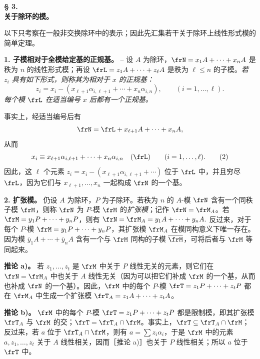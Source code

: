 \begin{center}
\textbf{§ 3.}\\[0.4em]
\textbf{关于除环的模。}
\end{center}

以下只考察在一般非交换除环中的表示；因此先汇集若干关于除环上线性形式模的简单定理。

\noindent\textbf{1. 子模相对于全模给定基的正规基。} -- 设 \(A\) 为除环，\(\frN=x_1A+\cdots+x_nA\) 是秩为 \(n\) 的线性形式模；再设 \(\frL=z_1A+\cdots+z_\ell A\) 是秩为 \(\ell\le n\) 的子模。\emph{若 \(z_i\) 具有如下形式，则称其为相对于 \(x\) 的正规基：}
\[
        z_i=x_i-(x_{\ell+1}\alpha_{i,\ell+1}+\cdots+x_n\alpha_{i,n}),
        \qquad (i=1,\ldots,\ell).
\]
\emph{每个模 \(\frL\) 在适当编号 \(x\) 后都有一个正规基。}

事实上，经适当编号后有
\[
        \frN=\frL+x_{\ell+1}A+\cdots+x_nA,
\]
从而
\[
        x_i\equiv x_{\ell+1}\alpha_{i,\ell+1}+\cdots+x_n\alpha_{i,n}
        \quad(\frL)\qquad (i=1,\ldots,\ell). \tag{2}
\]
因此，这 \(\ell\) 个元素 \(z_i=x_i-(x_{\ell+1}\alpha_{i,\ell+1}+\cdots)\) 位于 \(\frL\) 中，并且穷尽 \(\frL\)，因为它们与 \(x_{\ell+1},\ldots,x_n\) 一起构成 \(\frN\) 的一个基。

\noindent\textbf{2. 扩张模。} 仍设 \(A\) 为除环，\(P\) 为子除环。若秩为 \(n\) 的 \(A\)-模 \(\frN\) 含有一个同秩子模 \(\frM\)，则称 \(\frN\) 为 \(P\)-模 \(\frM\) 的\emph{扩张模}；记作 \(\frN=\frM_A\)。若 \(\frM=y_1P+\cdots+y_nP\)，则有 \(\frN=\frM_A=y_1A+\cdots+y_nA.\) 反过来，对于每个 \(P\)-模 \(\frM=y_1P+\cdots+y_nP\)，其扩张模 \(\frM_A\) 在模同构意义下唯一存在。因为模 \(\overline y_1A+\cdots+\overline y_nA\) 含有一个与 \(\frM\) 同构的子模 \(\overline{\frM}\)，可将后者与 \(\frM\) 等同起来。

\noindent\textbf{推论 a)。} 若 \(z_1,\ldots,z_t\) 是 \(\frM\) 中关于 \(P\) 线性无关的元素，则它们在 \(\frN=\frM_A\) 中也关于 \(A\) 线性无关（因为可以把它们补成 \(\frM\) 的一个基，从而也补成 \(\frN\) 的一个基）。因此，\(\frM\) 中的每个 \(P\)-模 \(\frT=z_1P+\cdots+z_tP\) 都在 \(\frM_A\) 中生成一个扩张模 \(\frT_A=z_1A+\cdots+z_tA\)。

\noindent\textbf{推论 b)。} \(\frM\) 中的每个 \(P\)-模 \(\frT=z_1P+\cdots+z_tP\) 都是限制模，即其扩张模 \(\frT_A\) 与 \(\frM\) 的交；\(\frT=\frT_A\cap\frM\)。事实上，\(\frT\subseteq \frT_A\cap\frM\)；反过来，若 \(a\) 位于 \(\frT_A\cap\frM\)，则有 \(a=\sum z_i\alpha_i\)，于是 \(\frM\) 中的元素 \(a,z_1,\ldots,z_t\) 关于 \(A\) 线性相关，因而［推论 a)］也关于 \(P\) 线性相关；所以 \(a\) 位于 \(\frT\) 中。

